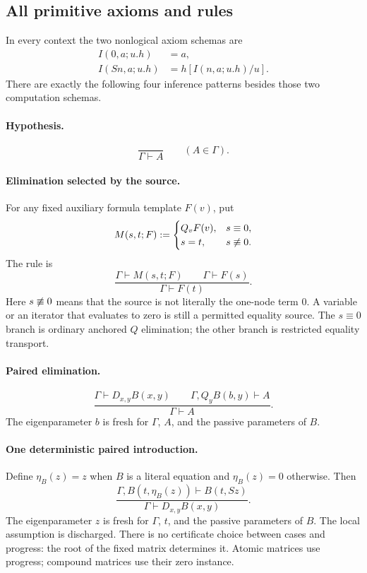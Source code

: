 \subsection{All primitive axioms and rules}

In every context the two nonlogical axiom schemas are
\begin{align}
 I(0,a;u.h)&=a, \tag{I0}\label{eq:i0}\\
 I(Sn,a;u.h)&=h[I(n,a;u.h)/u]. \tag{IS}\label{eq:is}
\end{align}
There are exactly the following four inference patterns besides those two
computation schemas.

\paragraph{Hypothesis.}
\[
 \frac{}{\Gamma\vdash A}\qquad(A\in\Gamma).
 \tag{Hyp}
\]

\paragraph{Elimination selected by the source.}
For any fixed auxiliary formula template $F(v)$, put
\[
 M(s,t;F):=
 \begin{cases}
 Q_vF(v),&s\equiv0,\\
 s=t,&s\not\equiv0.
 \end{cases}
\]
The rule is
\[
 \frac{\Gamma\vdash M(s,t;F)\qquad\Gamma\vdash F(s)}
      {\Gamma\vdash F(t)}.
 \tag{SE}\label{eq:se}
\]
Here $s\not\equiv0$ means that the source is not literally the one-node term
$0$. A variable or an iterator that evaluates to zero is still a permitted
equality source. The $s\equiv0$ branch is ordinary anchored $Q$ elimination;
the other branch is restricted equality transport.

\paragraph{Paired elimination.}
\[
 \frac{\Gamma\vdash D_{x,y}B(x,y)\qquad
       \Gamma,Q_yB(b,y)\vdash A}
      {\Gamma\vdash A}.
 \tag{DE}\label{eq:de}
\]
The eigenparameter $b$ is fresh for $\Gamma$, $A$, and the passive
parameters of $B$.

\paragraph{One deterministic paired introduction.}
Define $\eta_B(z)=z$ when $B$ is a literal equation and $\eta_B(z)=0$
otherwise. Then
\[
 \frac{\Gamma,B(t,\eta_B(z))\vdash B(t,Sz)}
      {\Gamma\vdash D_{x,y}B(x,y)}.
 \tag{DI}\label{eq:di}
\]
The eigenparameter $z$ is fresh for $\Gamma$, $t$, and the passive
parameters of $B$. The local assumption is discharged. There is no
certificate choice between cases and progress: the root of the fixed
matrix determines it. Atomic matrices use progress; compound matrices use
their zero instance.

